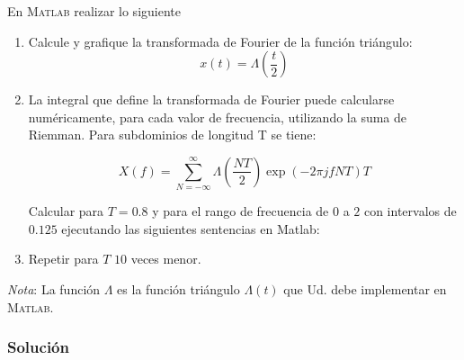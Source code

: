\documentclass[a4paper,12pt,final]{article}
\begin{document}
    \noindent  En \textsc{Matlab} realizar lo siguiente
      \begin{enumerate}[label=\alph*)]
        \item Calcule y grafique la transformada de Fourier de la función triángulo:
              $$x\left(t\right) = \Lambda\left(\frac{t}{2}\right)$$
        \item La integral que define la transformada de Fourier puede calcularse
          numéricamente, para cada valor de frecuencia, utilizando la suma de
          Riemman. Para subdominios de longitud T se tiene:

          $$X\left(f\right)=\sum_{N=-\infty}^{\infty}\Lambda\left(\frac{N T}{2}\right)\exp(-2 \pi j f N T )T$$

          Calcular para $T=0.8$ y para el rango de frecuencia de $0$ a $2$ con
          intervalos de $0.125$ ejecutando las siguientes sentencias en Matlab:

          \vspace{-1.5em}

        \item Repetir para $T$ $10$ veces menor.
      \end{enumerate}

      \emph{Nota}: La función $\Lambda$ es la función triángulo
      $\Lambda\left(t\right)$ que Ud. debe implementar en \textsc{Matlab}.

    \subsubsection*{Solución}
\end{document}
